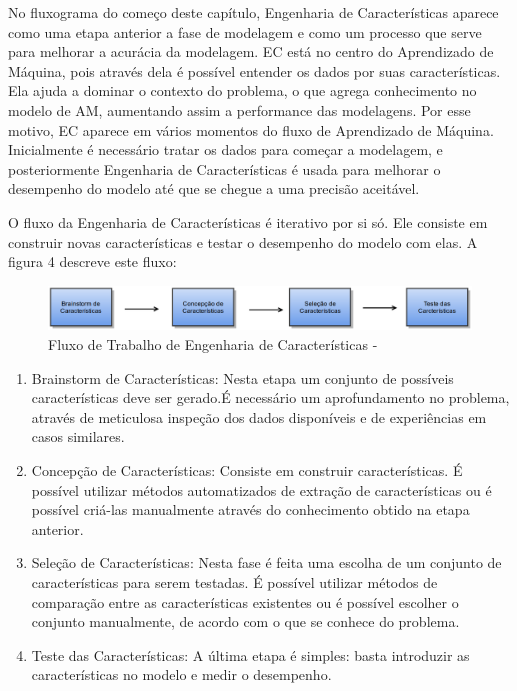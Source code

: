 No fluxograma do começo deste capítulo, Engenharia de Características aparece como uma etapa anterior a fase de modelagem e como um processo que serve para melhorar a acurácia da modelagem. EC está no centro do Aprendizado de Máquina, pois através dela é possível entender os dados por suas características. Ela ajuda a dominar o contexto do problema, o que agrega conhecimento no modelo de AM, aumentando assim a performance das modelagens. Por esse motivo, EC aparece em vários momentos do fluxo de Aprendizado de Máquina. Inicialmente é necessário tratar os dados para começar a modelagem, e posteriormente Engenharia de Características é usada para melhorar o desempenho do modelo até que se chegue a uma precisão aceitável. 

O fluxo da Engenharia de Características é iterativo por si só. Ele consiste em construir novas características e testar o desempenho do modelo com elas. A figura 4 descreve este fluxo:


\begin{figure}[!h]
\centering
\includegraphics[keepaspectratio=true,scale=0.32]
{figuras/ecworflow.eps}
\caption{Fluxo de Trabalho de Engenharia de Características - \cite{fe2014}}
\label{workflow_ec}
\end{figure}

\begin{enumerate}
\item Brainstorm de Características: Nesta etapa um conjunto de possíveis características deve ser gerado.É necessário um aprofundamento no problema, através de meticulosa inspeção dos dados disponíveis e de experiências em casos similares. 
\item Concepção de Características: Consiste em construir características. É possível utilizar métodos automatizados de extração de características ou é possível criá-las manualmente através do conhecimento obtido na etapa anterior.
\item Seleção de Características: Nesta fase é feita uma escolha de um conjunto de características para serem testadas. É possível utilizar métodos de comparação entre as características existentes ou é possível escolher o conjunto  manualmente, de acordo com o que se conhece do problema.
\item Teste das Características: A última etapa é simples: basta introduzir as características no modelo e medir o desempenho.
\end{enumerate}

